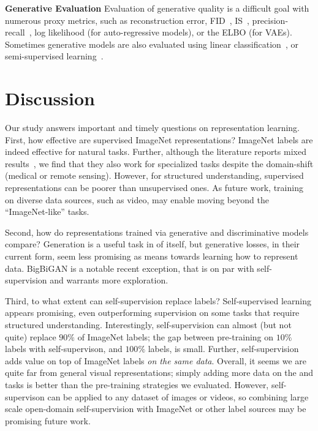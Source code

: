 \textbf{Generative Evaluation}\quad
Evaluation of generative quality is a difficult goal with numerous proxy metrics, such as reconstruction error, FID~\citep{heusel2017gans}, IS~\citep{salimans2016improved}, precision-recall~\citep{sajjadi2018assessing}, log likelihood (for auto-regressive models), or the ELBO (for VAEs). Sometimes generative models are also evaluated using linear classification~\citep{radford2016,donahue2016adversarial,dumoulin2016adversarially}, or semi-supervised learning~\citep{kingma2014semi, narayanaswamy2017learning,tschannen2018recent}.

\section{Discussion}
Our study answers important and timely questions on representation learning. First, how effective are supervised ImageNet representations? ImageNet labels are indeed effective for natural tasks. Further, although the literature reports mixed results~\citep{liu2017detecting,raghu2019,neumann2019domain}, we find that they also work for specialized tasks despite the domain-shift (medical or remote sensing). However, for structured understanding, supervised representations can be poorer than unsupervised ones. As future work, training on diverse data sources, such as video, may enable moving beyond the ``ImageNet-like'' tasks.

Second, how do representations trained via generative and discriminative models compare? Generation is a useful task in of itself, but generative losses, in their current form, seem less promising as means towards learning how to represent data. BigBiGAN is a notable recent exception, that is on par with self-supervision and warrants more exploration.

Third, to what extent can self-supervision replace labels? Self-supervised learning appears promising, even outperforming supervision on some tasks that require structured understanding. Interestingly, self-supervision can almost (but not quite) replace $90\%$ of ImageNet labels; the gap between pre-training on $10\%$ labels with self-supervison, and $100\%$ labels, is small. Further, self-supervision adds value on top of ImageNet labels \emph{on the same data}. Overall, it seems we are quite far from general visual representations; simply adding more data on the \taskSpecialized{} and \taskStructured{} tasks is better than the pre-training strategies we evaluated. However, self-supervison can be applied to any dataset of images or videos, so combining large scale open-domain self-supervision with ImageNet or other label sources may be promising future work.

